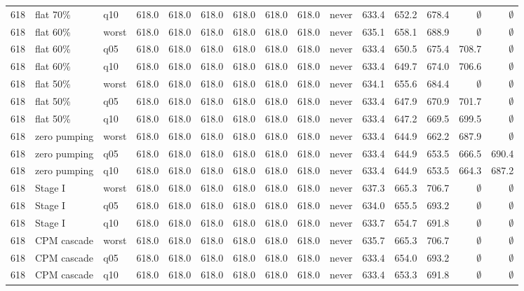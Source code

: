 \begin{longtable}{lllrrrrrrlrrrrr}
618 & flat 70\% & q10 & 618.0 & 618.0 & 618.0 & 618.0 & 618.0 & 618.0 & never & 633.4 & 652.2 & 678.4 & $\emptyset$ & $\emptyset$ \\
618 & flat 60\% & worst & 618.0 & 618.0 & 618.0 & 618.0 & 618.0 & 618.0 & never & 635.1 & 658.1 & 688.9 & $\emptyset$ & $\emptyset$ \\
618 & flat 60\% & q05 & 618.0 & 618.0 & 618.0 & 618.0 & 618.0 & 618.0 & never & 633.4 & 650.5 & 675.4 & 708.7 & $\emptyset$ \\
618 & flat 60\% & q10 & 618.0 & 618.0 & 618.0 & 618.0 & 618.0 & 618.0 & never & 633.4 & 649.7 & 674.0 & 706.6 & $\emptyset$ \\
618 & flat 50\% & worst & 618.0 & 618.0 & 618.0 & 618.0 & 618.0 & 618.0 & never & 634.1 & 655.6 & 684.4 & $\emptyset$ & $\emptyset$ \\
618 & flat 50\% & q05 & 618.0 & 618.0 & 618.0 & 618.0 & 618.0 & 618.0 & never & 633.4 & 647.9 & 670.9 & 701.7 & $\emptyset$ \\
618 & flat 50\% & q10 & 618.0 & 618.0 & 618.0 & 618.0 & 618.0 & 618.0 & never & 633.4 & 647.2 & 669.5 & 699.5 & $\emptyset$ \\
618 & zero pumping & worst & 618.0 & 618.0 & 618.0 & 618.0 & 618.0 & 618.0 & never & 633.4 & 644.9 & 662.2 & 687.9 & $\emptyset$ \\
618 & zero pumping & q05 & 618.0 & 618.0 & 618.0 & 618.0 & 618.0 & 618.0 & never & 633.4 & 644.9 & 653.5 & 666.5 & 690.4 \\
618 & zero pumping & q10 & 618.0 & 618.0 & 618.0 & 618.0 & 618.0 & 618.0 & never & 633.4 & 644.9 & 653.5 & 664.3 & 687.2 \\
618 & Stage I & worst & 618.0 & 618.0 & 618.0 & 618.0 & 618.0 & 618.0 & never & 637.3 & 665.3 & 706.7 & $\emptyset$ & $\emptyset$ \\
618 & Stage I & q05 & 618.0 & 618.0 & 618.0 & 618.0 & 618.0 & 618.0 & never & 634.0 & 655.5 & 693.2 & $\emptyset$ & $\emptyset$ \\
618 & Stage I & q10 & 618.0 & 618.0 & 618.0 & 618.0 & 618.0 & 618.0 & never & 633.7 & 654.7 & 691.8 & $\emptyset$ & $\emptyset$ \\
618 & CPM cascade & worst & 618.0 & 618.0 & 618.0 & 618.0 & 618.0 & 618.0 & never & 635.7 & 665.3 & 706.7 & $\emptyset$ & $\emptyset$ \\
618 & CPM cascade & q05 & 618.0 & 618.0 & 618.0 & 618.0 & 618.0 & 618.0 & never & 633.4 & 654.0 & 693.2 & $\emptyset$ & $\emptyset$ \\
618 & CPM cascade & q10 & 618.0 & 618.0 & 618.0 & 618.0 & 618.0 & 618.0 & never & 633.4 & 653.3 & 691.8 & $\emptyset$ & $\emptyset$ \\

\end{longtable}
